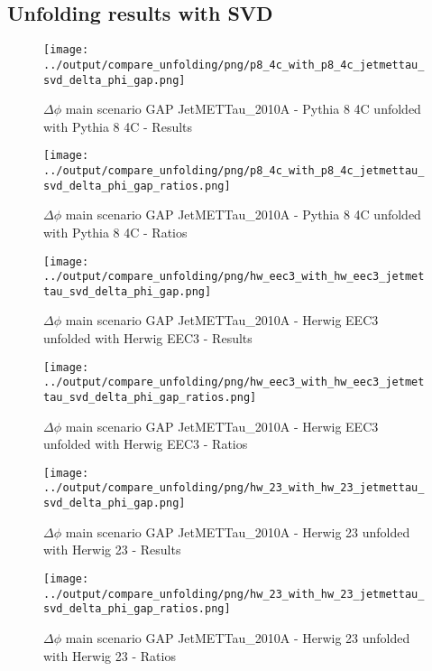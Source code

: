 \documentclass[11pt]{book}
\begin{document}
\clearpage
\subsection{Unfolding results with SVD}

\begin{figure}[ht]
\centering
\texttt{[image: ../output/compare\_unfolding/png/p8\_4c\_with\_p8\_4c\_jetmettau\_svd\_delta\_phi\_gap.png]}
\caption{$\Delta\phi$ main scenario GAP JetMETTau\_2010A - Pythia 8 4C unfolded with Pythia 8 4C - Results}
\label{p8_p8_jetmettau_svd_delta_phi_gap_a}
\end{figure}

\begin{figure}[ht]
\centering
\texttt{[image: ../output/compare\_unfolding/png/p8\_4c\_with\_p8\_4c\_jetmettau\_svd\_delta\_phi\_gap\_ratios.png]}
\caption{$\Delta\phi$ main scenario GAP JetMETTau\_2010A - Pythia 8 4C unfolded with Pythia 8 4C - Ratios}
\label{p8_p8_jetmettau_svd_delta_phi_gap_b}
\end{figure}

\begin{figure}[ht]
\centering
\texttt{[image: ../output/compare\_unfolding/png/hw\_eec3\_with\_hw\_eec3\_jetmettau\_svd\_delta\_phi\_gap.png]}
\caption{$\Delta\phi$ main scenario GAP JetMETTau\_2010A - Herwig EEC3 unfolded with Herwig EEC3 - Results}
\label{hw_eec3_hw_eec3_jetmettau_svd_delta_phi_gap_a}
\end{figure}

\begin{figure}[ht]
\centering
\texttt{[image: ../output/compare\_unfolding/png/hw\_eec3\_with\_hw\_eec3\_jetmettau\_svd\_delta\_phi\_gap\_ratios.png]}
\caption{$\Delta\phi$ main scenario GAP JetMETTau\_2010A - Herwig EEC3 unfolded with Herwig EEC3 - Ratios}
\label{hw_eec3_hw_eec3_jetmettau_svd_delta_phi_gap_b}
\end{figure}

\begin{figure}[ht]
\centering
\texttt{[image: ../output/compare\_unfolding/png/hw\_23\_with\_hw\_23\_jetmettau\_svd\_delta\_phi\_gap.png]}
\caption{$\Delta\phi$ main scenario GAP JetMETTau\_2010A - Herwig 23 unfolded with Herwig 23 - Results}
\label{hw_23_hw_23_jetmettau_svd_delta_phi_gap_a}
\end{figure}

\begin{figure}[ht]
\centering
\texttt{[image: ../output/compare\_unfolding/png/hw\_23\_with\_hw\_23\_jetmettau\_svd\_delta\_phi\_gap\_ratios.png]}
\caption{$\Delta\phi$ main scenario GAP JetMETTau\_2010A - Herwig 23 unfolded with Herwig 23 - Ratios}
\label{hw_23_hw_23_jetmettau_svd_delta_phi_gap_b}
\end{figure}
\end{document}
